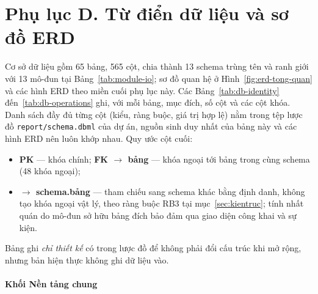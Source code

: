 
\section*{Phụ lục D. Từ điển dữ liệu và sơ đồ ERD}
\label{apdx:tudien}

Cơ sở dữ liệu gồm 65 bảng, 565 cột, chia thành 13 schema trùng tên và ranh giới với 13 mô-đun tại Bảng~\ref{tab:module-io}; sơ đồ quan hệ ở Hình~\ref{fig:erd-tong-quan} và các hình ERD theo miền cuối phụ lục này. Các Bảng~\ref{tab:db-identity} đến~\ref{tab:db-operations} ghi, với mỗi bảng, mục đích, số cột và các cột khóa. Danh sách đầy đủ từng cột (kiểu, ràng buộc, giá trị hợp lệ) nằm trong tệp lược đồ \texttt{report/schema.dbml} của dự án, nguồn sinh duy nhất của bảng này và các hình ERD nên luôn khớp nhau. Quy ước cột cuối:
\begin{itemize}
    \item \textbf{PK} --- khóa chính; \textbf{FK $\to$ bảng} --- khóa ngoại tới bảng trong cùng schema (48 khóa ngoại);
    \item \textbf{$\to$ schema.bảng} --- tham chiếu sang schema khác bằng định danh, không tạo khóa ngoại vật lý, theo ràng buộc RB3 tại mục~\ref{sec:kientruc}; tính nhất quán do mô-đun sở hữu bảng đích bảo đảm qua giao diện công khai và sự kiện.
\end{itemize}
Bảng ghi \emph{chỉ thiết kế} có trong lược đồ để không phải đổi cấu trúc khi mở rộng, nhưng bản hiện thực không ghi dữ liệu vào.

\paragraph*{Khối Nền tảng chung}

